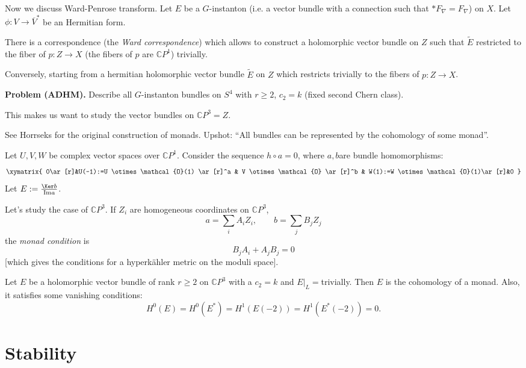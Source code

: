 \documentclass{book}
\begin{document}
\medskip\noindent
Now we discuss Ward-Penrose transform.
Let $E$ be a $G$-instanton
(i.e. a vector bundle with a connection such
that
$*F_\nabla=F_\nabla$) on $X$.
Let $\phi:V \to \overline{V}^*$ be an
Hermitian form.

There is a correspondence (the {\it Ward
correspondence})
which allows to construct a holomorphic
vector bundle on $Z$
such that $\tilde{E}$ restricted to the fiber
of $p:Z \to X$
(the fibers of $p$ are $\mathbb{C}P^1$)
trivially.

Conversely, starting from a hermitian
holomorphic vector bundle $\tilde{E}$
on $Z$ which restricts trivially to the
fibers of $p:Z \to X$.

\medskip\noindent
{\bf Problem (ADHM).} Describe all
$G$-instanton bundles on $S^4$
with $r \geq 2$, $c_2=k$ (fixed second Chern
class).

This makes us want to study the vector
bundles on $\mathbb{C}P^3=Z$.

See Horrseks for the original construction of
monads.
Upshot: ``All bundles can be represented by
the cohomology of some monad''.

\begin{definition}[Monad]
\label{definition-monad}
Let $U,V,W$ be complex vector spaces over
$\mathbb{C}P^1$.
Consider the sequence $h \circ a=0$, where
$a,b$are bundle homomorphisms:
$$
\xymatrix{
0\ar[r]&U(-1):=U \otimes \mathcal{O}(1)
\ar[r]^a
& V \otimes \mathcal{O}
\ar[r]^b
& W(1):=W \otimes \mathcal{O}(1)\ar[r]&0
}
$$
Let $E:=\frac{\Ker b}{\text{Im}a}$.
\end{definition}

\medskip\noindent
Let's study the case of $\mathbb{C}P^3$.
If $Z_i$ are homogeneous coordinates on
$\mathbb{C}P^3$,
$$
a=\sum_i A_iZ_i,\qquad b=\sum_jB_jZ_j
$$
the {\it monad condition} is
$$
B_jA_i+A_jB_j=0
$$
[which gives the conditions for a hyperkähler
metric on the moduli space].

\begin{theorem}
\label{theorem-bbh}
Let $E$ be a holomorphic vector bundle of
rank $r \geq 2$
on $\mathbb{C}P^3$ with a $c_2=k$ and
$E|_L=$trivially.
Then $E$ is the cohomology of a monad.
Also, it satisfies some vanishing conditions:
$$
H^0(E)=H^0(E^*)=H^1(E(-2))=H^1(E^*(-2))=0.
$$
\end{theorem}






\section{Stability}
\label{section-stability}
\end{document}
